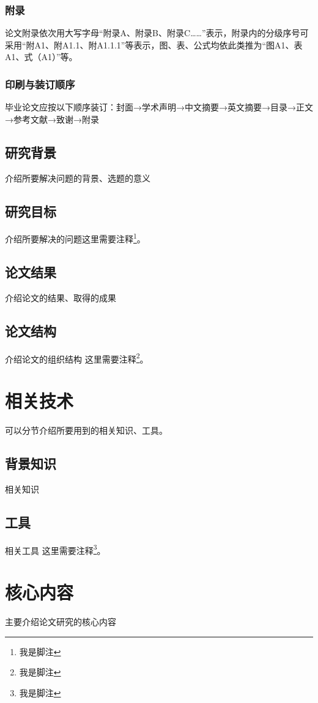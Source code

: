\documentclass[a4paper,fancyhdr,fntef,UTF8,hyperref,openany,oneside,notitlepage]{book}%
\begin{document}
\subsection{附录}
论文附录依次用大写字母“附录A、附录B、附录C……”表示，附录内的分级序号可采用“附A1、附A1.1、附A1.1.1”等表示，图、表、公式均依此类推为“图A1、表A1、式（A1）”等。

\subsection{印刷与装订顺序}
毕业论文应按以下顺序装订：封面→学术声明→中文摘要→英文摘要→目录→正文→参考文献→致谢→附录

\section{研究背景}
介绍所要解决问题的背景、选题的意义

\section{研究目标}

介绍所要解决的问题这里需要注释\footnote{我是脚注}。
\section{论文结果}

介绍论文的结果、取得的成果
\section{论文结构}
介绍论文的组织结构
这里需要注释\footnote{我是脚注}。
\chapter{相关技术}

可以分节介绍所要用到的相关知识、工具。
\section{背景知识}
相关知识

\section{工具}
相关工具
这里需要注释\footnote{我是脚注}。
\chapter{核心内容}
主要介绍论文研究的核心内容
\end{document}
